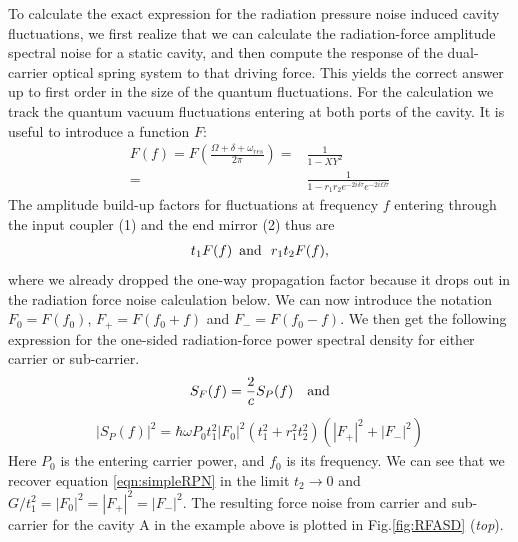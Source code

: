 To calculate the exact expression for the radiation pressure noise induced cavity fluctuations, we first realize that we can calculate the radiation-force amplitude spectral noise for a static cavity, and then compute the response of the dual-carrier optical spring system to that driving force. This yields the correct answer up to first order in the size of the quantum fluctuations. For the calculation we track the quantum vacuum fluctuations entering at both ports of the cavity. It is useful to introduce a function $F$:
\begin{eqnarray}
\label{eqn:RPNfunction}
F(f) = F\left(\frac{\Omega + \delta + \omega_{res}}{2 \pi}\right) =& \frac{1}{1-XY^2}  \\ =& \frac{1}{1-r_1r_2e^{-2 i \delta\tau}e^{-2 i \Omega\tau}}
\end{eqnarray}
The amplitude build-up factors for fluctuations at frequency $f$ entering through the input coupler (1) and the end mirror (2) thus are
\begin{eqnarray}
\label{eqn:RPNfunction12}
 t_1 F(f) \,\,\, {\rm and} \,\,\ r_1 t_2 F(f), 
\end{eqnarray}
where we already dropped the one-way propagation factor because it drops out in the radiation force noise calculation below. 
We can now introduce the notation $F_0=F(f_0)$, $F_+=F(f_0+f)$ and $F_-=F(f_0-f)$. We then get the following expression for the one-sided radiation-force power spectral density for either carrier or sub-carrier.
\begin{eqnarray}
\label{eqn:RPN_P}
S_F (f) = \frac{2}{c} S_P (f) \,\,\,\,\,\, {\rm and}
\end{eqnarray}
\begin{eqnarray}
\label{eqn:RPN}
|S_P (f)|^2 =   \hbar \omega P_0 t_1^2|F_0|^2 (t_1^2 \!\!+\! r_1^2t_2^2)( |F_+|^2 \!\!+\!  |F_-|^2)
\end{eqnarray}
Here $P_0$ is the entering carrier power, and $f_0$ is its frequency. We can see that we recover equation \ref{eqn:simpleRPN} in the limit $t_2 \rightarrow 0$ and $G/t_1^2=|F_0|^2=|F_+|^2=|F_-|^2$. The resulting force noise from carrier and sub-carrier for the cavity A in the example above is plotted in Fig.\ref{fig:RFASD} (\emph{top}).

